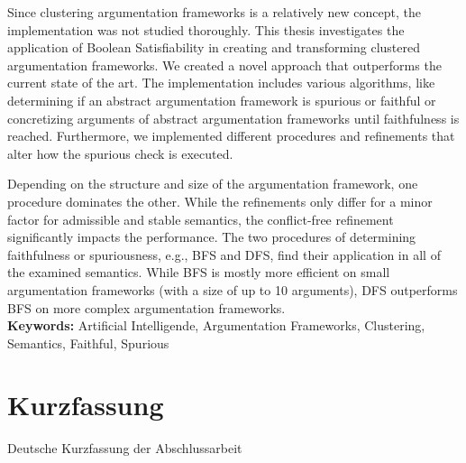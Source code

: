 \documentclass[twoside,openright]{scrreprt}
\begin{document}
Since clustering argumentation frameworks is a relatively new concept, the implementation was not studied thoroughly. This thesis investigates the application of Boolean Satisfiability in creating and transforming clustered argumentation frameworks. We created a novel approach that outperforms the current state of the art. The implementation includes various algorithms, like determining if an abstract argumentation framework is spurious or faithful or concretizing arguments of abstract argumentation frameworks until faithfulness is reached. Furthermore, we implemented different procedures and refinements that alter how the spurious check is executed. 

Depending on the structure and size of the argumentation framework, one procedure dominates the other. While the refinements only differ for a minor factor for admissible and stable semantics, the conflict-free refinement significantly impacts the performance. The two procedures of determining faithfulness or spuriousness, e.g., BFS and DFS, find their application in all of the examined semantics. While BFS is mostly more efficient on small argumentation frameworks (with a size of up to 10 arguments), DFS outperforms BFS on more complex argumentation frameworks. \\

\noindent
\textbf{Keywords:} Artificial Intelligende, Argumentation Frameworks, Clustering, Semantics, Faithful, Spurious





\chapter*{Kurzfassung}

Deutsche Kurzfassung der Abschlussarbeit


\cleardoublepage

\chapter*{}


\cleardoublepage
\end{document}
